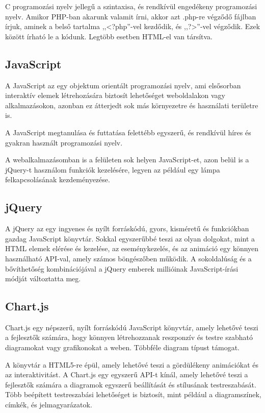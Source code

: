 \documentclass[
]{thesis-ekf}
\theoremstyle{definition}
\theoremstyle{remark}
\begin{document}
	C programozási nyelv jellegű a szintaxisa, és rendkívül engedékeny programozási nyelv. Amikor PHP-ban akarunk valamit írni, akkor azt .php-re végződő fájlban írjuk, aminek a belső tartalma ,,<?php''-vel kezdődik, és ,,?>''-vel végződik. Ezek között írható le a kódunk. Legtöbb esetben HTML-el van társítva.
	
	\subsection{JavaScript}
	A JavaScript az egy objektum orientált programozási nyelv, ami elsősorban interaktív elemek létrehozására biztosít lehetőséget weboldalakon vagy alkalmazásokon, azonban ez átterjedt sok más környezetre és használati területre is.
	
	A JavaScript megtanulása és futtatása felettébb egyszerű, és rendkívül híres és gyakran használt programozási nyelv.\cite{javascript}
	
	A webalkalmazásomban is a felületen sok helyen JavaScript-et, azon belül is a jQuery-t használom funkciók kezelésére, legyen az például egy lámpa felkapcsolásának kezdeményezése.
	
	\subsection{jQuery}
	A jQuery az egy ingyenes és nyílt forráskódú, gyors, kisméretű és funkciókban gazdag JavaScript könyvtár. Sokkal egyszerűbbé teszi az olyan dolgokat, mint a HTML elemek elérése és kezelése, az eseménykezelés, és az animáció egy könnyen használható API-val, amely számos böngészőben működik. A sokoldalúság és a bővíthetőség kombinációjával a jQuery emberek millióinak JavaScript-írási módját változtatta meg. \cite{jquery}
	
	\subsection{Chart.js}
	Chart.js egy népszerű, nyílt forráskódú JavaScript könyvtár, amely lehetővé teszi a fejlesztők számára, hogy könnyen létrehozzanak reszponzív és testre szabható diagramokat vagy grafikonokat a weben. Többféle diagram típust támogat.
	
	A könyvtár a HTML5-re épül, amely lehetővé teszi a gördülékeny animációkat és az interaktivitást. A Chart.js egy egyszerű API-t kínál, amely lehetővé teszi a fejlesztők számára a diagramok egyszerű beállítását és stílusának testreszabását. Több beépített testreszabási lehetőséget is biztosít, mint például a diagramszínek, címkék, és jelmagyarázatok.\cite{chartJS}
	
\end{document}
